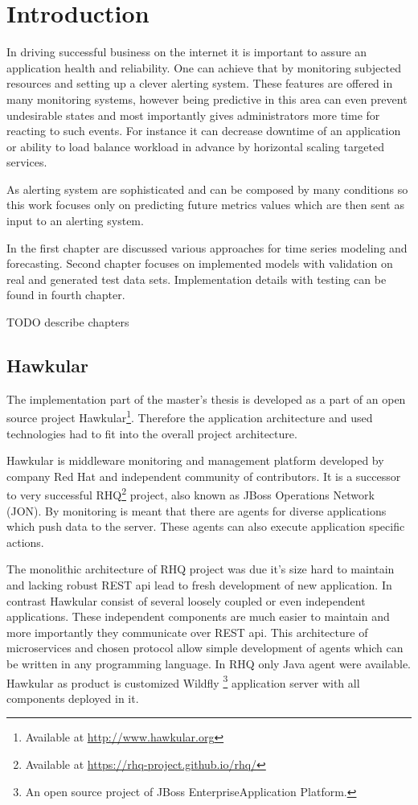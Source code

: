 
\chapter{Introduction}
In driving successful business on the internet it is important to assure an application
health and reliability. One can achieve that by monitoring subjected resources and setting
up a clever alerting system. These features are offered in many monitoring systems, however 
being predictive in this area can even prevent undesirable states and most importantly gives administrators more time for
reacting to such events. For instance it can decrease downtime of an application 
or ability to load balance workload in advance by horizontal scaling targeted services. 

As alerting system are sophisticated and can be composed by many conditions so this work
focuses only on predicting future metrics values which are then sent as input to an alerting system. 

In the first chapter are discussed various approaches for time series modeling and
forecasting. Second chapter focuses on implemented models with validation on real and 
generated test data sets. Implementation details with testing can be found in fourth chapter.

TODO describe chapters

    \section{Hawkular}
    The implementation part of the master's thesis is developed as a part of an open source project
    Hawkular\footnote{Available at \url{http://www.hawkular.org}}. 
    Therefore the application architecture and used technologies had to fit 
    into the overall project architecture.

    Hawkular is middleware monitoring and management platform
    developed by company Red Hat and independent community of contributors.
    It is a successor to very successful RHQ\footnote{Available at \url{https://rhq-project.github.io/rhq/}} 
    project, also known as JBoss Operations Network (JON).
    By monitoring is meant that there are agents for diverse applications which
    push data to the server. These agents can also execute application specific actions. 

    The monolithic architecture of RHQ project was due it's size hard to maintain 
    and lacking robust REST api lead to fresh development of new application.   
    In contrast Hawkular consist of several loosely coupled or even independent applications.
    These independent components are much
    easier to maintain and more importantly they communicate over REST api. This
    architecture of microservices and chosen protocol allow simple development of 
    agents which can be written in any programming language. In RHQ only Java agent were
    available. Hawkular as product is customized Wildfly
    \footnote{An open source project of JBoss EnterpriseApplication Platform.}
    application server with all components deployed in it.

